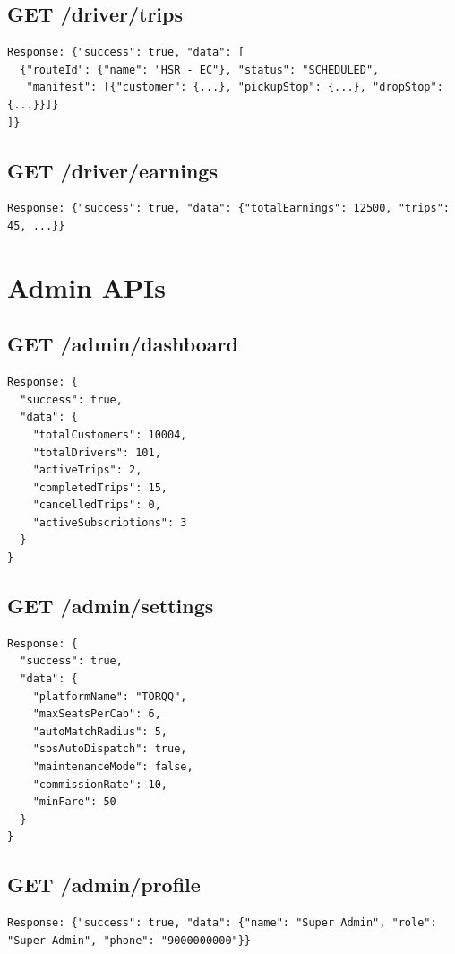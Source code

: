 \documentclass[11pt,a4paper]{article}
\begin{document}
\subsection{GET /driver/trips}
\begin{lstlisting}
Response: {"success": true, "data": [
  {"routeId": {"name": "HSR - EC"}, "status": "SCHEDULED",
   "manifest": [{"customer": {...}, "pickupStop": {...}, "dropStop": {...}}]}
]}
\end{lstlisting}

\subsection{GET /driver/earnings}
\begin{lstlisting}
Response: {"success": true, "data": {"totalEarnings": 12500, "trips": 45, ...}}
\end{lstlisting}

\section{Admin APIs}

\subsection{GET /admin/dashboard}
\begin{lstlisting}
Response: {
  "success": true,
  "data": {
    "totalCustomers": 10004,
    "totalDrivers": 101,
    "activeTrips": 2,
    "completedTrips": 15,
    "cancelledTrips": 0,
    "activeSubscriptions": 3
  }
}
\end{lstlisting}

\subsection{GET /admin/settings}
\begin{lstlisting}
Response: {
  "success": true,
  "data": {
    "platformName": "TORQQ",
    "maxSeatsPerCab": 6,
    "autoMatchRadius": 5,
    "sosAutoDispatch": true,
    "maintenanceMode": false,
    "commissionRate": 10,
    "minFare": 50
  }
}
\end{lstlisting}

\subsection{GET /admin/profile}
\begin{lstlisting}
Response: {"success": true, "data": {"name": "Super Admin", "role": "Super Admin", "phone": "9000000000"}}
\end{lstlisting}
\end{document}
